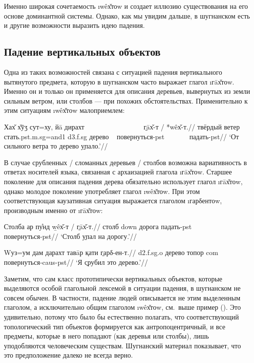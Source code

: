 Именно широкая сочетаемость \i{wêх̌тоw} и создает иллюзию существования на его основе доминантной системы. Однако, как мы увидим дальше, в шугнанском есть и другие возможности выразить идею падения.

\subsection{Падение вертикальных объектов} \label{down-vertical}

Одна из таких возможностей связана с ситуацией падения вертикального вытянутого предмета, которую в шугнанском часто выражает глагол \i{гāх̌тоw}. Именно он и только он применяется для описания деревьев, вывернутых из земли сильным ветром, или столбов — при похожих обстоятельствах. Применительно к этим ситуациям \i{wêх̌тоw} малоприемлем:

\begingl
\gla Хах̌ х̌ӯӡ сут=ху, йā дирахт ~~~~~~~~~~~~~~~~ \b{гāх̌-т} / *wêх̌-т.//
\glc твёрдый ветер стать.{\sc pst.m.sg=and1} {\sc d3.f.sg} дерево ~ повернуться-{\sc pst} ~~~~~~ падать-{\sc pst}//
\glft ‘От сильного ветра то дерево \b{упало}.’//
\endgl \xe

В случае срубленных / сломанных деревьев / столбов возможна вариативность в ответах носителей языка, связанная с архаизацией глагола \i{гāх̌тоw}. Старшее поколение для описания падения дерева обязательно использует глагол \i{гāх̌тоw}, однако молодое поколение употребляет глагол \i{wêх̌тоw}. При этом соответствующая каузативная ситуация выражается глаголом \i{гарδентоw}, производным именно от \i{гāх̌тоw}:

\begingl
\gla Столба ар пу̊нд \b{wêх̌-т} / \b{гāх̌-т}.//
\glc столб {\sc down} дорога падать-{\sc pst} ~~~~~~ повернуться-{\sc pst}//
\glft ‘Столб \b{упал} на дорогу.’//
\endgl \xe

\begingl
\gla Wуз=ум дам дарахт тавāр қати \b{гарδ-ен-т}.//
 {\sc d2.f.sg.o} дерево топор {\sc com} повернуться-{\sc caus-pst}//
\glft ‘Я \b{срубил} это дерево.’//
\endgl \xe

Заметим, что сам класс прототипически вертикальных объектов, которые выделяются особой глагольной лексемой в ситуации падения, в шугнанском не совсем обычен. В частности, падение людей описывается не этим выделенным глаголом, а исключительно общим глаголом \i{wêх̌тоw}, см.~выше пример (). Это удивительно, потому что было бы естественно полагать, что соответствующий топологический тип объектов формируется как антропоцентричный, и все предметы, которые в него попадают (как деревья или столбы), лишь уподобляются человеческим существам. Шугнанский материал показывает, что это предположение далеко не всегда верно.

